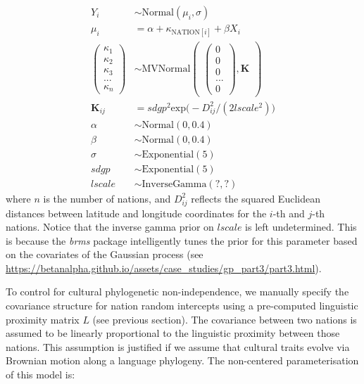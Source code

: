 \documentclass[english,man,floatsintext]{apa6}
\begin{document}
\[
\begin{aligned}
Y_{i} &\sim \text{Normal}(\mu_{i},\sigma) \\
\mu_{i} &= \alpha + \kappa_{\text{NATION}[i]} + \beta X_{i} \\
\begin{pmatrix}
\kappa_{1} \\ \kappa_{2} \\ \kappa_{3} \\ ... \\ \kappa_{n}
\end{pmatrix} &\sim \text{MVNormal}
\begin{pmatrix}
\begin{pmatrix}
0 \\ 0 \\ 0 \\ ... \\ 0
\end{pmatrix},\textbf{K}
\end{pmatrix}\\
\textbf{K}_{ij} &= sdgp^2 \text{exp} \big (-D_{ij}^2 / (2 lscale^2) \big )\\
\alpha &\sim \text{Normal}(0, 0.4) \\
\beta &\sim \text{Normal}(0, 0.4) \\
\sigma &\sim \text{Exponential}(5) \\
sdgp &\sim \text{Exponential}(5) \\
lscale &\sim \text{InverseGamma}(?,?)
\end{aligned}
\]
where \(n\) is the number of nations, and \(D^2_{ij}\) reflects the squared Euclidean distances between latitude and longitude coordinates for the \(i\)-th and \(j\)-th nations. Notice that the inverse gamma prior on \(lscale\) is left undetermined. This is because the \emph{brms} package intelligently tunes the prior for this parameter based on the covariates of the Gaussian process (see \url{https://betanalpha.github.io/assets/case_studies/gp_part3/part3.html}).

\newpage

To control for cultural phylogenetic non-independence, we manually specify the covariance structure for nation random intercepts using a pre-computed linguistic proximity matrix \(L\) (see previous section). The covariance between two nations is assumed to be linearly proportional to the linguistic proximity between those nations. This assumption is justified if we assume that cultural traits evolve via Brownian motion along a language phylogeny. The non-centered parameterisation of this model is:
\end{document}
